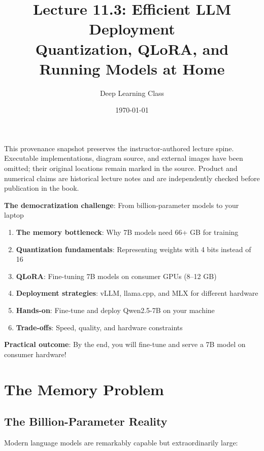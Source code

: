 \documentclass{article}
\title{Lecture 11.3: Efficient LLM Deployment\\
Quantization, QLoRA, and Running Models at Home}
\author{Deep Learning Class}
\date{\today}
\begin{document}
\maketitle

\begin{tcolorbox}[colback=gray!5!white, colframe=gray!60!black, title=Public Snapshot Boundary]
This provenance snapshot preserves the instructor-authored lecture spine. Executable
implementations, diagram source, and external images have been omitted; their original
locations remain marked in the source. Product and numerical claims are historical
lecture notes and are independently checked before publication in the book.
\end{tcolorbox}

\begin{tcolorbox}[colback=blue!5!white, colframe=blue!75!black, title=Lecture Overview]
\textbf{The democratization challenge}: From billion-parameter models to your laptop

\begin{enumerate}
\item \textbf{The memory bottleneck}: Why 7B models need 66+ GB for training
\item \textbf{Quantization fundamentals}: Representing weights with 4 bits instead of 16
\item \textbf{QLoRA}: Fine-tuning 7B models on consumer GPUs (8--12 GB)
\item \textbf{Deployment strategies}: vLLM, llama.cpp, and MLX for different hardware
\item \textbf{Hands-on}: Fine-tune and deploy Qwen2.5-7B on your machine
\item \textbf{Trade-offs}: Speed, quality, and hardware constraints
\end{enumerate}

\textbf{Practical outcome}: By the end, you will fine-tune and serve a 7B model on consumer hardware!
\end{tcolorbox}

\section{The Memory Problem}

\subsection{The Billion-Parameter Reality}

Modern language models are remarkably capable but extraordinarily large:
\end{document}
